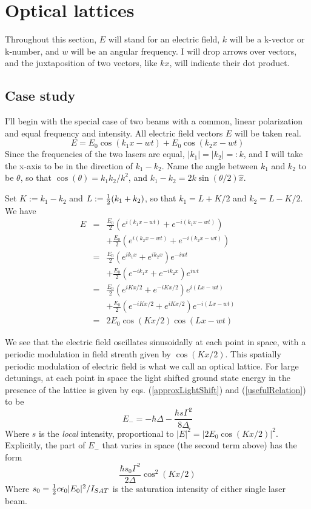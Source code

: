 \documentclass[aps,twocolumn,prb,floatfix,amsmath,amssymb,groupedaddress]{revtex4}
\begin{document}
\section{Optical lattices}
Throughout this section, $E$ will stand for an electric field, $k$ will be a k-vector or k-number, and $w$ will be an angular frequency.  I will drop arrows over vectors, and the juxtaposition of two vectors, like $kx$, will indicate their dot product.

\subsection{Case study}
I'll begin with the special case of two beams with a common, linear polarization and equal frequency and intensity.  All electric field vectors $E$ will be taken real.
\[E = E_0 \cos(k_1x-wt) + E_0 \cos(k_2x-wt)\]
Since the frequencies of the two lasers are equal, $|k_1| = |k_2|=:k$, and I will take the x-axis to be in the direction of $k_1-k_2$.  Name the angle between $k_1$ and $k_2$ to be $\theta$, so that $\cos(\theta) = k_1k_2 / k^2$, and $k_1-k_2 = 2k\sin(\theta/2) \hat{x}$.

Set $K:=k_1-k_2$ and $L:={\frac{1}{2}}(k_1+k_2)$, so that $k_1 = L+K/2$ and $k_2=L-K/2$.  We have
\begin{eqnarray*}
E & = & \frac{E_0}{2} \left(e^{i(k_1x-wt)}+e^{-i(k_1x-wt)}\right)\\
& &  + \frac{E_0}{2} \left(e^{i(k_2x-wt)}+e^{-i(k_2x-wt)}\right) \\
& = & \frac{E_0}{2} \left(e^{ik_1x} + e^{ik_2x}\right) e^{-iwt} \\
& & + \frac{E_0}{2} \left(e^{-ik_1x} + e^{-ik_2x}\right)e^{iwt} \\
& = & \frac{E_0}{2} \left(e^{iKx/2} + e^{-iKx/2}\right) e^{i(Lx-wt)} \\
& & + \frac{E_0}{2} \left(e^{-iKx/2} + e^{iKx/2}\right)e^{-i(Lx-wt)} \\
& = & 2E_0\cos(Kx/2)\cos(Lx-wt)
\end{eqnarray*}

We see that the electric field oscillates sinusoidally at each point in space, with a periodic modulation in field strenth given by $\cos(Kx/2)$.  This spatially periodic modulation of electric field is what we call an optical lattice.  For large detunings, at each point in space the light shifted ground state energy in the presence of the lattice is given by eqs. (\ref{approxLightShift}) and (\ref{usefulRelation}) to be
\[E_- = -\hbar\Delta -\frac{\hbar s \Gamma^2}{8\Delta}\]
Where $s$ is the \textit{local} intensity, proportional to $|E|^2 = |2E_0 \cos(Kx/2)|^2$.  Explicitly, the part of $E_-$ that varies in space (the second term above) has the form
\[\frac{\hbar s_0 \Gamma^2}{2\Delta} \cos^2(Kx/2)\]
Where $s_0 = {\frac{1}{2}} c\epsilon_0 |E_0|^2/I_{SAT}$ is the saturation intensity of either single laser beam. 
\end{document}
